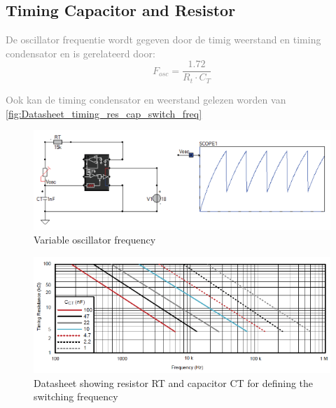 \subsection{Timing Capacitor and Resistor}\label{Timing Capacitor and Resistor}
\textcolor{gray}{De oscillator frequentie wordt gegeven door de timig weerstand en timing condensator en is gerelateerd door: }
\textcolor{gray}{
\begin{equation}
F_{osc} = \frac{1.72}{R_t\cdot C_T }
\label{Eq_Fosc}
\end{equation}
}

\textcolor{gray}{Ook kan de timing condensator en weerstand gelezen worden van \autoref{fig:Datasheet_timing_res_cap_switch_freq}}

\begin{figure}[!h]
    \centering
    \includegraphics[width=0.5\linewidth]{img//hfd3/Variable oscillator frequency.png}
    \caption{Variable oscillator frequency}
    \label{fig:Variable oscillator frequency}
\end{figure}

\begin{figure}[!h]
    \centering
    \includegraphics[width=0.5\linewidth]{img//hfd3/Datasheet showing resistor RT and capacitor CT for defining the switching frequency.png}
    \caption{Datasheet showing resistor RT and capacitor CT for defining the
switching frequency}
    \label{fig:Datasheet_timing_res_cap_switch_freq}
\end{figure}